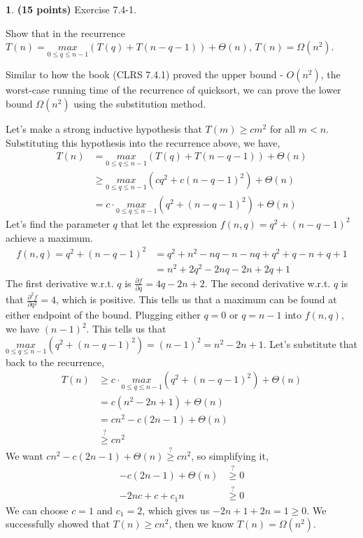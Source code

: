 \documentclass[11pt]{article}
\theoremstyle{definition}
\theoremstyle{theorem}
\newtheorem{prob}{}
\newcommand{\solution}{\medskip\noindent{\color{DarkBlue}\textbf{Solution:}}}
\begin{document}
\newpage
\begin{prob} \textbf{(15 points)} Exercise 7.4-1.

Show that in the recurrence
$T(n) = \underset{0 \leq q \leq n-1}{max} (T(q) + T(n-q-1)) + \Theta{(n)}$, $T(n) = \Omega{(n^2)}$.

\solution

Similar to how the book (CLRS 7.4.1) proved the upper bound - $O(n^2)$, the worst-case running time of the recurrence of quicksort, we can prove the lower bound $\Omega{(n^2)}$ using the substitution method.

Let's make a strong inductive hypothesis that $T(m) \ge c m^2$ for all $m < n$. Substituting this hypothesis into the recurrence above, we have,
\[
\begin{split}
T(n) &= \underset{0 \leq q \leq n-1}{max} (T(q) + T(n-q-1)) + \Theta{(n)} \\
&\ge \underset{0 \leq q \leq n-1}{max} (cq^2 + c(n-q-1)^2) + \Theta{(n)} \\
&= c \cdot \underset{0 \leq q \leq n-1}{max} (q^2 + (n-q-1)^2) + \Theta{(n)}
\end{split}
\]
Let's find the parameter $q$ that let the expression $f(n, q) = q^2 + (n-q-1)^2$ achieve a maximum.
\[
\begin{split}
f(n, q) = q^2 + (n-q-1)^2 &= q^2 + n^2 - nq -n - nq + q^2 + q - n + q + 1 \\
&= n^2 + 2q^2 - 2nq - 2n + 2q + 1
\end{split}
\]
The first derivative w.r.t. $q$ is $\frac{\partial f}{\partial q} = 4q - 2n + 2$. The second derivative w.r.t. $q$ is that $\frac{\partial^2 f}{\partial q^2} = 4$, which is positive. This tells us that a maximum can be found at either endpoint of the bound. Plugging either $q = 0$ or $q = n-1$ into $f(n, q)$, we have $(n-1)^2$. This tells us that $\underset{0 \leq q \leq n-1}{max} (q^2 + (n-q-1)^2) = (n-1)^2 = n^2 - 2n + 1$. Let's substitute that back to the recurrence,
\[
\begin{split}
T(n) &\ge c \cdot \underset{0 \leq q \leq n-1}{max} (q^2 + (n-q-1)^2) + \Theta{(n)} \\
&= c (n^2 - 2n + 1) + \Theta{(n)} \\
&= c n^2 - c(2n - 1) + \Theta{(n)} \\
&\stackrel{?}{\ge} cn^2 
\end{split}
\]
We want $c n^2 - c(2n - 1) + \Theta{(n)} \stackrel{?}{\ge} cn^2$, so simplifying it, 
\[
\begin{split}
- c(2n - 1) + \Theta{(n)} &\stackrel{?}{\ge} 0 \\
-2nc + c + c_1 n &\stackrel{?}{\ge} 0
\end{split}
\]
We can choose $c = 1$ and $c_1 = 2$, which gives us $-2n + 1 + 2n = 1 \ge 0$. We successfully showed that $T(n) \ge c n^2$, then we know $T(n) = \Omega{(n^2)}$.
\end{prob} 
\end{document}
